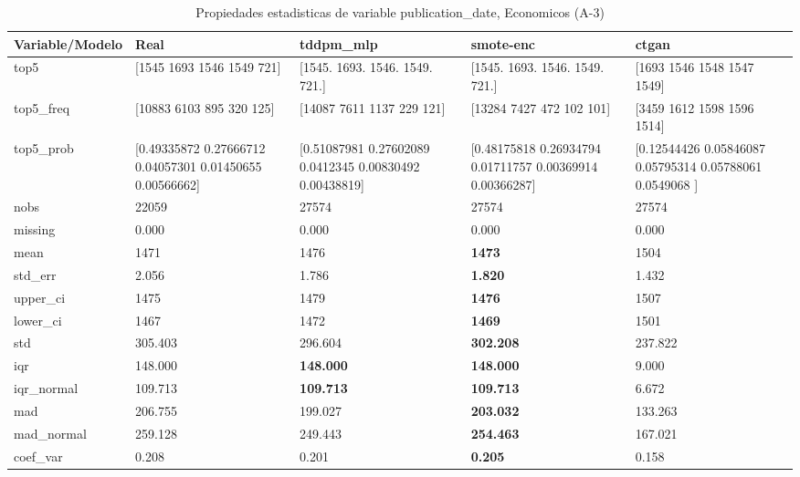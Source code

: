 \begin{table}[H]
\centering
\fontsize{8}{14}\selectfont
\caption{Propiedades  estadisticas de variable publication\_date, Economicos (A-3)}
\label{table-stats-economicos-a-3-publication_date}
\begin{tabular}{|l|m{10em}|m{10em}|m{10em}|m{10em}|}
\hline
 \rowcolor[gray]{0.8}
Variable/Modelo & Real & tddpm\_mlp & smote-enc & ctgan \\
\hline top5 & [1545 1693 1546 1549  721] & [1545. 1693. 1546. 1549.  721.] & [1545. 1693. 1546. 1549.  721.] & [1693 1546 1548 1547 1549] \\
\hline top5\_freq & [10883  6103   895   320   125] & [14087  7611  1137   229   121] & [13284  7427   472   102   101] & [3459 1612 1598 1596 1514] \\
\hline top5\_prob & [0.49335872 0.27666712 0.04057301 0.01450655 0.00566662] & [0.51087981 0.27602089 0.0412345  0.00830492 0.00438819] & [0.48175818 0.26934794 0.01711757 0.00369914 0.00366287] & [0.12544426 0.05846087 0.05795314 0.05788061 0.0549068 ] \\
\hline nobs & 22059 & 27574 & 27574 & 27574 \\
\hline missing & 0.000 & 0.000 & 0.000 & 0.000 \\
\hline mean & 1471 & 1476 & \bfseries 1473 & \cellcolor[rgb]{0.9, 0.54, 0.52} 1504 \\
\hline std\_err & 2.056 & 1.786 & \bfseries 1.820 & \cellcolor[rgb]{0.9, 0.54, 0.52} 1.432 \\
\hline upper\_ci & 1475 & 1479 & \bfseries 1476 & \cellcolor[rgb]{0.9, 0.54, 0.52} 1507 \\
\hline lower\_ci & 1467 & 1472 & \bfseries 1469 & \cellcolor[rgb]{0.9, 0.54, 0.52} 1501 \\
\hline std & 305.403 & 296.604 & \bfseries 302.208 & \cellcolor[rgb]{0.9, 0.54, 0.52} 237.822 \\
\hline iqr & 148.000 & \bfseries 148.000 & \bfseries 148.000 & \cellcolor[rgb]{0.9, 0.54, 0.52} 9.000 \\
\hline iqr\_normal & 109.713 & \bfseries 109.713 & \bfseries 109.713 & \cellcolor[rgb]{0.9, 0.54, 0.52} 6.672 \\
\hline mad & 206.755 & 199.027 & \bfseries 203.032 & \cellcolor[rgb]{0.9, 0.54, 0.52} 133.263 \\
\hline mad\_normal & 259.128 & 249.443 & \bfseries 254.463 & \cellcolor[rgb]{0.9, 0.54, 0.52} 167.021 \\
\hline coef\_var & 0.208 & 0.201 & \bfseries 0.205 & \cellcolor[rgb]{0.9, 0.54, 0.52} 0.158 \\

\end{tabular}
\end{table}
